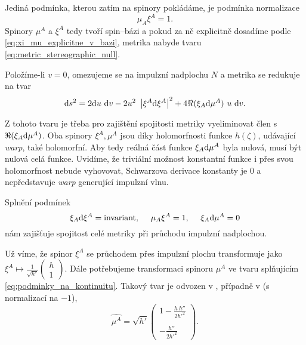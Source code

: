 Jediná podmínka, kterou zatím na spinory pokládáme, je podmínka normalizace
\begin{equation}
    \mu_A \xi^A = 1.
\end{equation}
Spinory $\mu^A$ a $\xi^A$ tedy tvoří spin--bázi a pokud za ně explicitně dosadíme podle
\eqref{eq:xi_mu_explicitne_v_bazi}, metrika nabyde tvaru \eqref{eq:metric_stereographic_null}.

Položíme-li $v=0$, omezujeme se na impulzní nadplochu $N$ a metrika se redukuje na tvar
\begin{equation}
    \mathrm{d} s^2 = 2 \mathrm{d} u ~\mathrm{d} v - 2 u^2 ~\left| \xi^A \mathrm{d} \xi^A \right|^2 + 4 \Re(\xi_A \mathrm{d} \mu^A) ~u~ \mathrm{d} v.
\end{equation}

Z tohoto tvaru je třeba pro zajištění spojitosti metriky vyeliminovat člen s $\Re(\xi_A \mathrm{d} \mu^A)$. Oba spinory
$\xi^A, \mu^A$ jsou díky holomorfnosti funkce $h(\zeta)$, udávající \emph{warp}, také holomorfní. Aby tedy reálná část
funkce $\xi_A \mathrm{d} \mu^A$ byla nulová, musí být nulová celá funkce. Uvidíme, že triviální možnost konstantní funkce i přes svou holomorfnost
nebude vyhovovat, Schwarzova derivace konstanty je 0 a nepředstavuje \emph{warp} generující impulzní vlnu.

Splnění podmínek 
\begin{equation}
    \label{eq:podminky_na_kontinuitu}
    \xi_A \mathrm{d} \xi^A = \text{invariant}, ~~~~ \mu_A \xi^A = 1,~~~~ \xi_A \mathrm{d} \mu^A = 0
\end{equation}
nám zajišťuje spojitost celé metriky při průchodu impulzní nadplochou.

Už víme, že spinor $\xi^A$ se průchodem přes impulzní plochu transformuje jako $\xi^A \mapsto \frac{1}{\sqrt{h'}} \begin{pmatrix}
    h \\ 1
\end{pmatrix}$. Dále potřebujeme transformaci spinoru $\mu^A$ ve tvaru splňujícím \eqref{eq:podminky_na_kontinuitu}.
Takový tvar je odvozen v \cite{scholtz_notes}, případně v \cite{Aliev2001} (s normalizací na $-1$),
\begin{equation}
    \label{eq:mu_transformace}
    \hat{\mu^A} = \sqrt{h'} \begin{pmatrix}
        1 - \frac{h ~h''}{2 h'^2} \\ ~ \\ - \frac{h''}{2 h'^2}
    \end{pmatrix}.
\end{equation}

